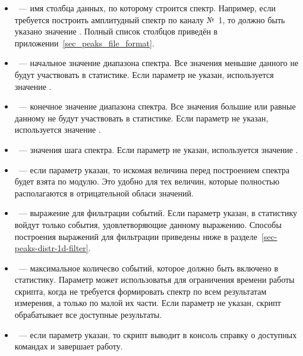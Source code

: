 \begin{itemize}

\item {}~--- имя столбца данных, по которому строится спектр. Например, если требуется построить амплитудный спектр по каналу №~1, то должно быть указано значение . Полный список столбцов приведён в приложении~\ref{sec_peaks_file_format}.

\item {}~--- начальное значение диапазона спектра. Все значения меньшие данного не будут участвовать в статистике. Если параметр не указан, используется значение .

\item {}~--- конечное значение диапазона спектра. Все значения большие или равные данному не будут участвовать в статистике. Если параметр не указан, используется значение .

\item {}~--- значения шага спектра. Если параметр не указан, используется значение .

\item {}~--- если параметр указан, то искомая величина перед построением спектра будет взята по модулю. Это удобно для тех величин, которые полностью располагаются в отрицательной обласи значений.

\item {}~--- выражение для фильтрации событий. Если параметр указан, в статистику войдут только события, удовлетворяющие данному выражению. Способы построения выражений для фильтрации приведены ниже в разделе~\ref{sec-peaks-distr-1d-filter}.

\item {}~--- максимальное количесво событий, которое должно быть включено в статистику. Параметр может использоватья для ограничения времени работы скрипта, когда не требуется формировать спектр по всем результатам измерения, а только по малой их части. Если параметр не указан, скрипт обрабатывает все доступные результаты.

\item {}~--- если параметр указан, то скрипт выводит в консоль справку о доступных командах и завершает работу.

\end{itemize}

